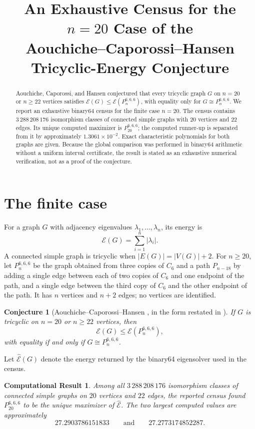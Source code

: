 \documentclass[11pt]{amsart}
\title[The $n=20$ tricyclic-energy census]
{An Exhaustive Census for the \texorpdfstring{$n=20$}{n=20} Case of the\\
Aouchiche--Caporossi--Hansen Tricyclic-Energy Conjecture}
\date{}
\newtheorem{conjecture}{Conjecture}
\newtheorem{result}{Computational Result}
\newcommand{\energy}{\mathcal E}
\newcommand{\cenergy}{\widehat{\mathcal E}}
\newcommand{\target}{P_{20}^{6,6,6}}
\begin{document}
\begin{abstract}
Aouchiche, Caporossi, and Hansen conjectured that every tricyclic graph
$G$ on $n=20$ or $n\ge 22$ vertices satisfies
$\energy(G)\le \energy(P_n^{6,6,6})$, with equality only for
$G\cong P_n^{6,6,6}$. We report an exhaustive binary64 census for the
finite case $n=20$. The census contains $3\,288\,208\,176$
isomorphism classes of connected simple graphs with $20$ vertices and
$22$ edges. Its unique computed maximizer is $\target$; the computed
runner-up is separated from it by approximately $1.3061\times10^{-2}$.
Exact characteristic polynomials for both graphs are given. Because
the global comparison was performed in binary64 arithmetic without a
uniform interval certificate, the result is stated as an exhaustive
numerical verification, not as a proof of the conjecture.
\end{abstract}

\maketitle

\section{The finite case}

For a graph $G$ with adjacency eigenvalues
$\lambda_1,\ldots,\lambda_n$, its energy is
\[
  \energy(G)=\sum_{i=1}^n |\lambda_i|.
\]
A connected simple graph is tricyclic when
$|E(G)|=|V(G)|+2$. For $n\ge20$, let $P_n^{6,6,6}$ be the graph
obtained from three copies of $C_6$ and a path $P_{n-18}$ by adding a
single edge between each of two copies of $C_6$ and one endpoint of the
path, and a single edge between the third copy of $C_6$ and the other
endpoint of the path. It has $n$ vertices and $n+2$ edges; no vertices
are identified.

\begin{conjecture}[Aouchiche--Caporossi--Hansen \cite{ACH}, in the form
restated in \cite{LSWL}]
If $G$ is tricyclic on $n=20$ or $n\ge22$ vertices, then
\[
  \energy(G)\le \energy(P_n^{6,6,6}),
\]
with equality if and only if $G\cong P_n^{6,6,6}$.
\end{conjecture}

Let $\cenergy(G)$ denote the energy returned by the binary64
eigensolver used in the census.

\begin{result}\label{res:main}
Among all $3\,288\,208\,176$ isomorphism classes of connected simple
graphs on $20$ vertices and $22$ edges, the reported census found
$\target$ to be the unique maximizer of $\cenergy$. The two largest
computed values are approximately
\[
  27.2903786151833
  \qquad\text{and}\qquad
  27.2773174852287.
\]
\end{result}
\end{document}

